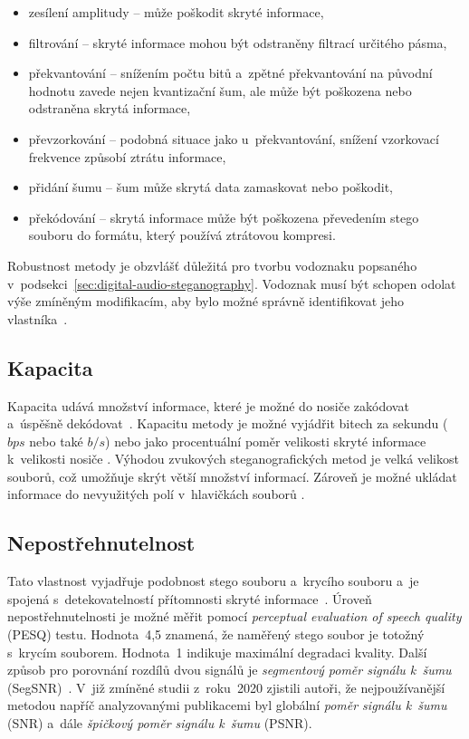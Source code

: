 \begin{itemize}
    \item zesílení amplitudy -- může poškodit skryté informace,
    \item filtrování -- skryté informace mohou být odstraněny filtrací určitého
        pásma,
    \item překvantování -- snížením počtu bitů a~zpětné překvantování na
        původní hodnotu zavede nejen kvantizační šum, ale může být poškozena
        nebo odstraněna skrytá informace,
    \item převzorkování -- podobná situace jako u~překvantování, snížení
        vzorkovací frekvence způsobí ztrátu informace,
    \item přidání šumu -- šum může skrytá data zamaskovat nebo poškodit,
    \item překódování -- skrytá informace může být poškozena převedením stego
        souboru do formátu, který používá ztrátovou kompresi.
\end{itemize}

Robustnost metody je obzvlášť důležitá pro tvorbu vodoznaku popsaného
v~podsekci~\ref{sec:digital-audio-steganography}. Vodoznak musí být schopen
odolat výše zmíněným modifikacím, aby bylo možné správně identifikovat jeho
vlastníka~\cite{Swanson1998}.

\subsection*{Kapacita}
\label{sub:capacity}

Kapacita udává množství informace, které je možné do nosiče zakódovat a~úspěšně
dekódovat~\cite{Dutta2020}\cite{Djebbar2012}. Kapacitu metody je možné vyjádřit
bitech za sekundu ($bps$ nebo také $b/s$) nebo jako procentuální poměr
velikosti skryté informace k~velikosti nosiče
\cite{AlSabhany2020}\cite{Dutta2020}. Výhodou zvukových steganografických metod
je velká velikost souborů, což umožňuje skrýt větší množství informací. Zároveň
je možné ukládat informace do nevyužitých polí v~hlavičkách souborů
\cite{Dutta2020}.

\subsection*{Nepostřehnutelnost}
\label{sub:imperceptibility}

Tato vlastnost vyjadřuje podobnost stego souboru a~krycího souboru a~je spojená
s~detekovatelností přítomnosti skryté informace~\cite{AlSabhany2020}. Úroveň
nepostřehnutelnosti je možné měřit pomocí \textit{perceptual evaluation of
speech quality} (PESQ) testu. Hodnota~4,5 znamená, že naměřený stego soubor je
totožný s~krycím souborem. Hodnota~1 indikuje maximální degradaci kvality.
Další způsob pro porovnání rozdílů dvou signálů je \textit{segmentový poměr
signálu k~šumu} (SegSNR)~\cite{Djebbar2012}. V~již zmíněné studii z~roku~2020
\cite{AlSabhany2020} zjistili autoři, že nejpoužívanější metodou napříč
analyzovanými publikacemi byl globální \textit{poměr signálu k~šumu} (SNR)
a~dále \textit{špičkový poměr signálu k~šumu} (PSNR).

